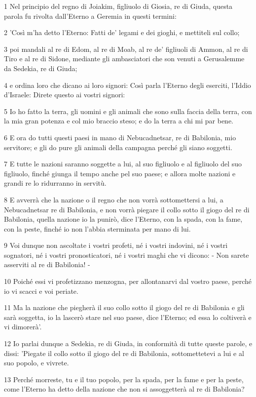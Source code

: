 \par 1 Nel principio del regno di Joiakim, figliuolo di Giosia, re di Giuda, questa parola fu rivolta dall'Eterno a Geremia in questi termini:
\par 2 'Così m'ha detto l'Eterno: Fatti de' legami e dei gioghi, e mettiteli sul collo;
\par 3 poi mandali al re di Edom, al re di Moab, al re de' figliuoli di Ammon, al re di Tiro e al re di Sidone, mediante gli ambasciatori che son venuti a Gerusalemme da Sedekia, re di Giuda;
\par 4 e ordina loro che dicano ai loro signori: Così parla l'Eterno degli eserciti, l'Iddio d'Israele: Direte questo ai vostri signori:
\par 5 Io ho fatto la terra, gli uomini e gli animali che sono sulla faccia della terra, con la mia gran potenza e col mio braccio steso; e do la terra a chi mi par bene.
\par 6 E ora do tutti questi paesi in mano di Nebucadnetsar, re di Babilonia, mio servitore; e gli do pure gli animali della campagna perché gli siano soggetti.
\par 7 E tutte le nazioni saranno soggette a lui, al suo figliuolo e al figliuolo del suo figliuolo, finché giunga il tempo anche pel suo paese; e allora molte nazioni e grandi re lo ridurranno in servitù.
\par 8 E avverrà che la nazione o il regno che non vorrà sottomettersi a lui, a Nebucadnetsar re di Babilonia, e non vorrà piegare il collo sotto il giogo del re di Babilonia, quella nazione io la punirò, dice l'Eterno, con la spada, con la fame, con la peste, finché io non l'abbia sterminata per mano di lui.
\par 9 Voi dunque non ascoltate i vostri profeti, né i vostri indovini, né i vostri sognatori, né i vostri pronosticatori, né i vostri maghi che vi dicono: - Non sarete asserviti al re di Babilonia! -
\par 10 Poiché essi vi profetizzano menzogna, per allontanarvi dal vostro paese, perché io vi scacci e voi periate.
\par 11 Ma la nazione che piegherà il suo collo sotto il giogo del re di Babilonia e gli sarà soggetta, io la lascerò stare nel suo paese, dice l'Eterno; ed essa lo coltiverà e vi dimorerà'.
\par 12 Io parlai dunque a Sedekia, re di Giuda, in conformità di tutte queste parole, e dissi: 'Piegate il collo sotto il giogo del re di Babilonia, sottomettetevi a lui e al suo popolo, e vivrete.
\par 13 Perché morreste, tu e il tuo popolo, per la spada, per la fame e per la peste, come l'Eterno ha detto della nazione che non si assoggetterà al re di Babilonia?
